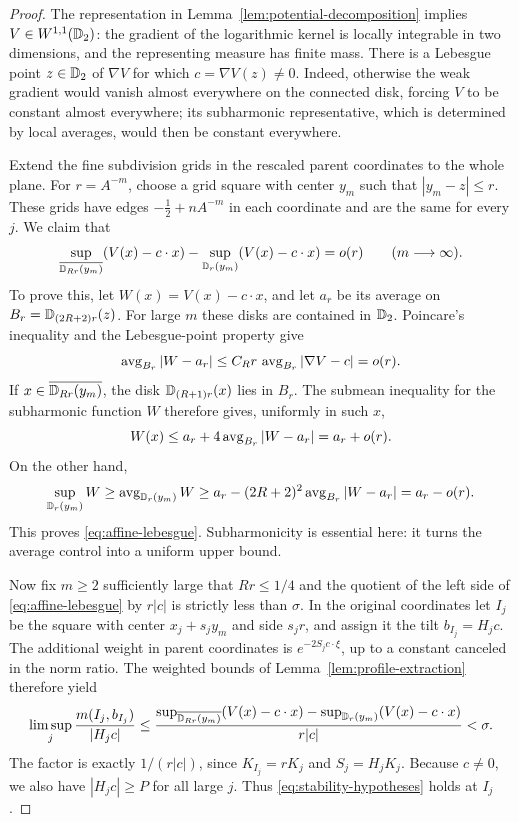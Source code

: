\begin{proof}
The representation in Lemma~\ref{lem:potential-decomposition} implies
$V\in W^{1,1}(\mathbb D_2)$: the gradient of the logarithmic kernel is locally
integrable in two dimensions, and the representing measure has finite
mass. There is a Lebesgue point $z\in\mathbb D_2$ of $\nabla V$ for which
$c=\nabla V(z)\ne0$. Indeed, otherwise the weak gradient would vanish
almost everywhere on the connected disk, forcing $V$ to be constant
almost everywhere; its subharmonic representative, which is determined
by local averages, would then be constant everywhere.

Extend the fine subdivision grids in the rescaled parent coordinates
to the whole plane. For $r=A^{-m}$, choose a grid square with center
$y_m$ such that $|y_m-z|\le r$. These grids have edges
$-\tfrac12+nA^{-m}$ in each coordinate and are the same for every $j$.
We claim that
\begin{equation}
\label{eq:affine-lebesgue}
 \sup_{\overline{\mathbb D_{Rr}(y_m)}}(V(x)-c\cdot x)
 -\sup_{\mathbb D_r(y_m)}(V(x)-c\cdot x)=o(r)
 \qquad(m\longrightarrow\infty).
\end{equation}
To prove this, let $W(x)=V(x)-c\cdot x$, and let $a_r$ be its average
on $B_r=\mathbb D_{(2R+2)r}(z)$. For large $m$ these disks are contained in
$\mathbb D_2$. Poincare's inequality and the Lebesgue-point property give
\[
 \operatorname{avg}_{B_r}|W-a_r|
 \le C_Rr\,\operatorname{avg}_{B_r}|\nabla V-c|=o(r).
\]
If $x\in\overline{\mathbb D_{Rr}(y_m)}$, the disk
$\mathbb D_{(R+1)r}(x)$ lies in $B_r$. The submean inequality for the
subharmonic function $W$ therefore gives, uniformly in such $x$,
\[
 W(x)\le a_r+4\operatorname{avg}_{B_r}|W-a_r|=a_r+o(r).
\]
On the other hand,
\[
 \sup_{\mathbb D_r(y_m)}W
 \ge\operatorname{avg}_{\mathbb D_r(y_m)}W
 \ge a_r-(2R+2)^2\operatorname{avg}_{B_r}|W-a_r|=a_r-o(r).
\]
This proves \eqref{eq:affine-lebesgue}. Subharmonicity is essential
here: it turns the average control into a uniform upper bound.

Now fix $m\ge2$ sufficiently large that $Rr\le1/4$ and the quotient of
the left side of \eqref{eq:affine-lebesgue} by $r|c|$ is strictly less
than $\sigma$. In the original coordinates let $I_j$ be the square
with center $x_j+s_jy_m$ and side $s_jr$, and assign it the tilt
$b_{I_j}=H_jc$. The additional weight in parent coordinates is
$e^{-2S_jc\cdot\xi}$, up to a constant canceled in the norm ratio.
The weighted bounds of Lemma~\ref{lem:profile-extraction} therefore yield
\begin{equation}
\label{eq:persistence-transfer}
 \limsup_j\frac{m(I_j,b_{I_j})}{|H_jc|}
 \le
 \frac{
 \sup_{\overline{\mathbb D_{Rr}(y_m)}}(V(x)-c\cdot x)
 -\sup_{\mathbb D_r(y_m)}(V(x)-c\cdot x)}{r|c|}
 <\sigma.
\end{equation}
The factor is exactly $1/(r|c|)$, since $K_{I_j}=rK_j$ and
$S_j=H_jK_j$. Because $c\ne0$, we also have $|H_jc|\ge P$ for all
large $j$. Thus \eqref{eq:stability-hypotheses} holds at $I_j$.


\end{proof}
